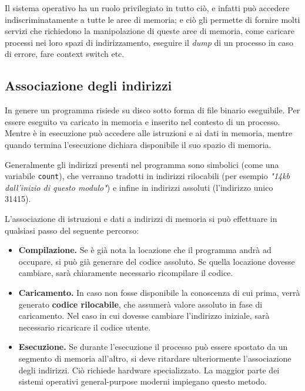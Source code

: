         Il sistema operativo ha un ruolo privilegiato in tutto ciò, e infatti può accedere indiscriminatamente a tutte le aree di memoria; e ciò gli permette di fornire molti servizi che richiedono la manipolazione di queste aree di memoria, come caricare processi nei loro spazi di indirizzamento, eseguire il \textit{dump} di un processo in caso di errore, fare context switch etc.
        
    \newpage
    \subsection{Associazione degli indirizzi}
        In genere un programma risiede su disco sotto forma di file binario eseguibile. Per essere eseguito va caricato in memoria e inserito nel contesto di un processo. Mentre è in esecuzione può accedere alle istruzioni e ai dati in memoria, mentre quando termina l'esecuzione dichiara disponibile il suo spazio di memoria.
        
        Generalmente gli indirizzi presenti nel programma sono simbolici (come una variabile \texttt{count}), che verranno tradotti in indirizzi rilocabili (per esempio \textit{"14kb dall'inizio di questo modulo"}) e infine in indirizzi assoluti (l'indirizzo unico 31415).
        
        L'associazione di istruzioni e dati a indirizzi di memoria si può effettuare in qualsiasi passo del seguente percorso:
        \begin{itemize}
            \item \textbf{Compilazione.} Se è già nota la locazione che il programma andrà ad occupare, si può già generare del codice assoluto. Se quella locazione dovesse cambiare, sarà chiaramente necessario ricompilare il codice.
            
            \item \textbf{Caricamento.} In caso non fosse disponibile la conoscenza di cui prima, verrà generato \textbf{codice rilocabile}, che assumerà valore assoluto in fase di caricamento. Nel caso in cui dovesse cambiare l'indirizzo iniziale, sarà necessario ricaricare il codice utente.
            
            \item \textbf{Esecuzione.} Se durante l'esecuzione il processo può essere spostato da un segmento di memoria all'altro, si deve ritardare ulteriormente l'associazione degli indirizzi. Ciò richiede hardware specializzato. La maggior parte dei sistemi operativi general-purpose moderni impiegano questo metodo.
        \end{itemize}
        
